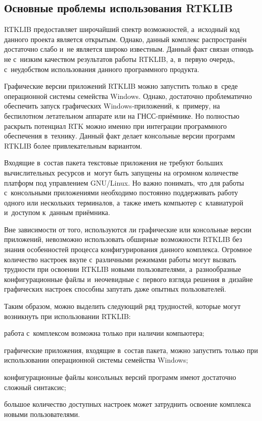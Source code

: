 \subsection{Основные проблемы использования RTKLIB}
\label{subsec:rtklib-problems}

RTKLIB предоставляет широчайший спектр возможностей, а~исходный код данного проекта является открытым. Однако, данный комплекс распространён достаточно слабо и~не является широко известным. Данный факт связан отнюдь не с~низким качеством результатов работы RTKLIB, а, в~первую очередь, с~неудобством использования данного программного продукта.

Графические версии приложений RTKLIB можно запустить только в~среде операционной системы семейства Windows. Однако, достаточно проблематично обеспечить запуск графических Windows-приложений, к~примеру, на беспилотном летательном аппарате или на ГНСС-приёмнике. Но полностью раскрыть потенциал RTK можно именно при интеграции программного обеспечения в~технику. Данный факт делает консольные версии программ RTKLIB более привлекательным вариантом.

Входящие в~состав пакета текстовые приложения не требуют больших вычислительных ресурсов и~могут быть запущены на огромном количестве платформ под управлением GNU/Linux. Но важно понимать, что для работы с~консольными приложениями необходимо постоянно поддерживать работу одного или нескольких терминалов, а~также иметь компьютер с~клавиатурой и~доступом к~данным приёмника.

Вне зависимости от того, используются ли графические или консольные версии приложений, невозможно использовать обширные возможности RTKLIB без знания особенностей процесса конфигурирования данного комплекса. Огромное количество настроек вкупе с~различными режимами работы могут вызвать трудности при освоении RTKLIB новыми пользователями, а~разнообразные конфигурационные файлы и~неочевидные с~первого взгляда решения в~дизайне графических настроек способны запутать даже опытных пользователей.

Таким образом, можно выделить следующий ряд трудностей, которые могут возникнуть при использовании RTKLIB:

\begin{dashitemize}
  \item работа с~комплексом возможна только при наличии компьютера;
  \item графические приложения, входящие в~состав пакета, можно запустить только при использовании операционной системы семейства Windows;
  \item конфигурационные файлы консольных версий программ имеют достаточно сложный синтаксис;
  \item большое количество доступных настроек может затруднить освоение комплекса новыми пользователями.
\end{dashitemize}

